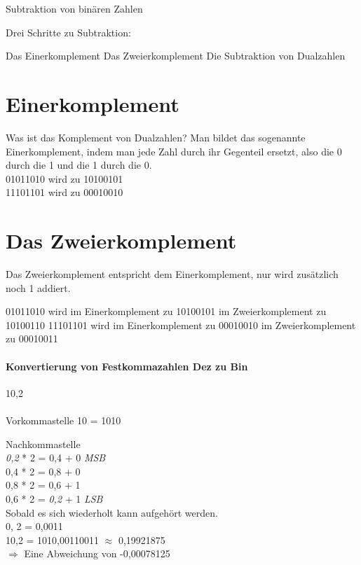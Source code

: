 \documentclass[12pt,a4paper]{scrartcl}
\begin{document}
Subtraktion von binären Zahlen

Drei Schritte zu Subtraktion:

Das Einerkomplement
Das Zweierkomplement
Die Subtraktion von Dualzahlen

\section*{Einerkomplement}

Was ist das Komplement von Dualzahlen? Man bildet das sogenannte Einerkomplement, indem man jede Zahl durch ihr Gegenteil ersetzt, also die 0 durch die 1 und die 1 durch die 0.\\

01011010 wird zu 10100101\\
11101101 wird zu 00010010\\

\section*{Das Zweierkomplement}

Das Zweierkomplement entspricht dem Einerkomplement, nur wird zusätzlich noch 1 addiert.

01011010 wird im Einerkomplement zu 10100101 im Zweierkomplement zu 10100110
11101101 wird im Einerkomplement zu 00010010 im Zweierkomplement zu 00010011

\paragraph{Konvertierung von Festkommazahlen Dez zu Bin}

10,2 \\
\\

Vorkommastelle
10 = 1010

Nachkommastelle\\
\emph{0,2} * 2 = 0,4 + 0 \emph{MSB} \\ 
0,4 * 2 = 0,8 + 0\\
0,8 * 2 = 0,6 + 1\\
0,6 * 2 = \emph{0,2} + 1 \emph{LSB} \\ 

Sobald es sich wiederholt kann aufgehört werden.\\
0, 2 = 0,0011\\
10,2 = 1010,00110011 $\approx$ 0,19921875
\\
$\Longrightarrow$ Eine Abweichung von  -0,00078125
\\
\end{document}
